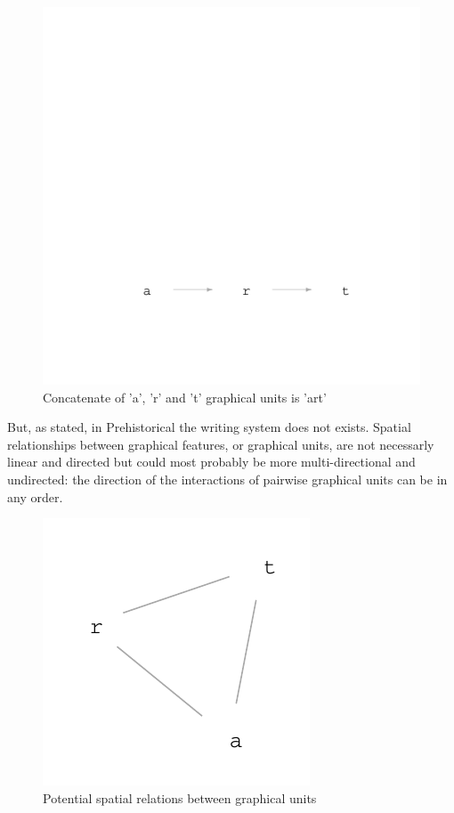 \documentclass[article]{jss}\usepackage{knitr}
\begin{document}
\smallbreak
\begin{figure}[H]

{\centering \includegraphics[width=\maxwidth,height=0.5\textheight]{figure/a_r_t-1} 

}

\caption{\label{fig:figs}Concatenate of 'a', 'r' and 't' graphical units is 'art'}\label{fig:a_r_t}
\end{figure}



But, as stated, in Prehistorical the writing system does not exists. Spatial relationships between graphical features, or graphical units, are not necessarly linear and directed but could most probably be more multi-directional and undirected: the direction of the interactions of pairwise graphical units can be in any order.

\begin{figure}[H]

{\centering \includegraphics[width=\maxwidth]{figure/unnamed-chunk-1-1} 

}

\caption{\label{fig:figs}Potential spatial relations between graphical units}\label{fig:unnamed-chunk-1}
\end{figure}
\end{document}
